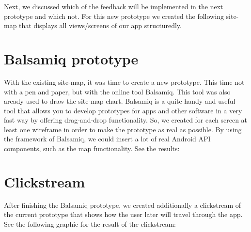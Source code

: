 \documentclass[11pt,twoside,a4paper]{report}
\begin{document}
Next, we discussed which of the feedback will be implemented in the next
prototype and which not. For this new prototype we created the following
site-map that displays all views/screens of our app structuredly.

\section{Balsamiq prototype}

With the existing site-map, it was time to create a new prototype. This
time not with a pen and paper, but with the online tool Balsamiq. This
tool was also aready used to draw the site-map chart. Balsamiq is a quite
handy and useful tool that allows you to develop prototypes for apps and
other software in a very fast way by oﬀering drag-and-drop functionality.
So, we created for each screen at least one wireframe in order to make the
prototype as real as possible. By using the framework of Balsamiq, we could
insert a lot of real Android API components, such as the map functionality.
See the results:

\section{Clickstream}

After ﬁnishing the Balsamiq prototype, we created additionally a clickstream
of the current prototype that shows how the user later will travel through
the app. See the following graphic for the result of the clickstream:
\end{document}
